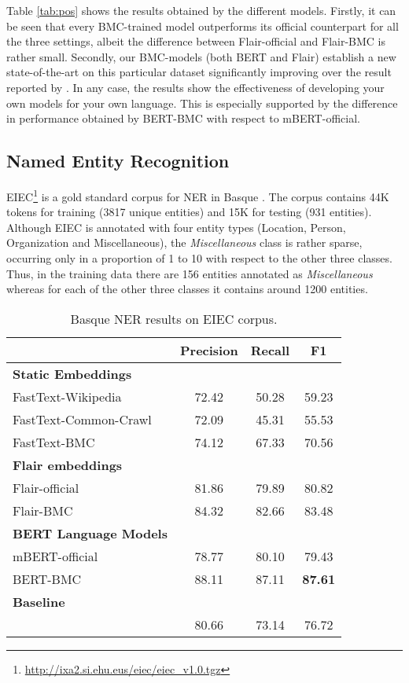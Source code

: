 \documentclass[10pt, a4paper]{article}
\begin{document}
Table \ref{tab:pos} shows the results obtained by the different models. Firstly, it can be seen that every BMC-trained model outperforms its official counterpart for all the three settings, albeit the difference between Flair-official and Flair-BMC is rather small. Secondly, our BMC-models (both BERT and Flair) establish a new state-of-the-art on this particular dataset significantly improving over the result reported by \cite{heinzerling-strube-2019-sequence}. In any case, the results show the effectiveness of developing your own models for your own language. This is especially supported by the difference in performance obtained by BERT-BMC with respect to mBERT-official.

\subsection{Named Entity Recognition}\label{sec:named-entity-recogn}

EIEC\footnote{\scriptsize{\url{http://ixa2.si.ehu.eus/eiec/eiec_v1.0.tgz}}} is a gold standard corpus for NER in Basque \cite{alegria2006lessons}. The corpus contains 44K tokens for training (3817 unique entities) and 15K for testing (931 entities). Although EIEC is annotated with four entity types (Location, Person, Organization and Miscellaneous), the \emph{Miscellaneous} class is rather sparse, occurring only in a proportion of 1 to 10 with respect to the other three classes. Thus, in the training data there are 156 entities annotated as \emph{Miscellaneous} whereas for each of the other three classes it contains around 1200 entities.

\begin{table}[!ht]\footnotesize
\centering
\begin{tabular}{@{\hspace{0.3cm}}lccc} \hline
 \textbf{} &\textbf{Precision} & \textbf{Recall} & \textbf{F1} \\ \hline
\textbf{Static Embeddings} & & &  \\
FastText-Wikipedia & 72.42 & 50.28 & 59.23 \\
FastText-Common-Crawl & 72.09 & 45.31 & 55.53 \\
FastText-BMC  & 74.12 & 67.33 & 70.56 \\
\hline%
\textbf{Flair embeddings}\\
Flair-official & 81.86 & 79.89 & 80.82 \\
Flair-BMC & 84.32 & 82.66 & 83.48 \\ \hline
\textbf{BERT Language Models} \\
mBERT-official  & 78.77 & 80.10 & 79.43 \\
BERT-BMC  & 88.11 & 87.11& \textbf{87.61} \\ \hline
\textbf{Baseline} \\
\cite{agerri2016robust} & 80.66 & 73.14 & 76.72 \\ \hline
\end{tabular}
\caption{Basque NER results on EIEC corpus.}\label{tab:ner}
\end{table}
\end{document}

